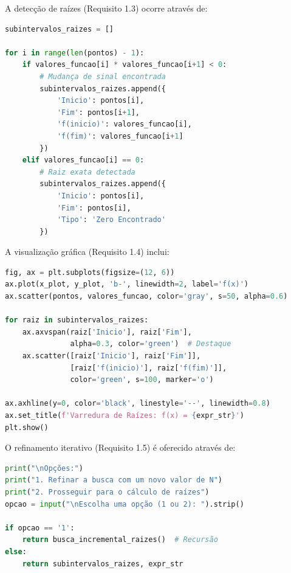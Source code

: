 \documentclass[
	12pt,				%
	openright,			%
	oneside,			%
	a4paper,			%
	english,			%
	brazil				%
	]{abntex2}
\begin{document}
A detecção de raízes (Requisito 1.3) ocorre através de:

\begin{lstlisting}[language=Python, caption={Requisito 1.3 - Detecção de Mudanças de Sinal}]
subintervalos_raizes = []

for i in range(len(pontos) - 1):
    if valores_funcao[i] * valores_funcao[i+1] < 0:
        # Mudança de sinal encontrada
        subintervalos_raizes.append({
            'Inicio': pontos[i],
            'Fim': pontos[i+1],
            'f(inicio)': valores_funcao[i],
            'f(fim)': valores_funcao[i+1]
        })
    elif valores_funcao[i] == 0:
        # Raiz exata detectada
        subintervalos_raizes.append({
            'Inicio': pontos[i],
            'Fim': pontos[i],
            'Tipo': 'Zero Encontrado'
        })
\end{lstlisting}

A visualização gráfica (Requisito 1.4) inclui:

\begin{lstlisting}[language=Python, caption={Requisito 1.4 - Plotagem com Destaque}]
fig, ax = plt.subplots(figsize=(12, 6))
ax.plot(x_plot, y_plot, 'b-', linewidth=2, label='f(x)')
ax.scatter(pontos, valores_funcao, color='gray', s=50, alpha=0.6)

for raiz in subintervalos_raizes:
    ax.axvspan(raiz['Inicio'], raiz['Fim'], 
               alpha=0.3, color='green')  # Destaque
    ax.scatter([raiz['Inicio'], raiz['Fim']], 
               [raiz['f(inicio)'], raiz['f(fim)']], 
               color='green', s=100, marker='o')

ax.axhline(y=0, color='black', linestyle='--', linewidth=0.8)
ax.set_title(f'Varredura de Raízes: f(x) = {expr_str}')
plt.show()
\end{lstlisting}

O refinamento iterativo (Requisito 1.5) é oferecido através de:

\begin{lstlisting}[language=Python, caption={Requisito 1.5 - Refinamento Iterativo}]
print("\nOpções:")
print("1. Refinar a busca com um novo valor de N")
print("2. Prosseguir para o cálculo de raízes")
opcao = input("\nEscolha uma opção (1 ou 2): ").strip()

if opcao == '1':
    return busca_incremental_raizes()  # Recursão
else:
    return subintervalos_raizes, expr_str
\end{lstlisting}

\vspace{0.3cm}
\end{document}

